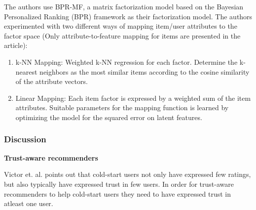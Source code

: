 The authors use BPR-MF, a matrix factorization model based on the Bayesian Personalized Ranking (BPR) framework as their factorization model. The authors experimented with two different ways of mapping item/user attributes to the factor space (Only attribute-to-feature mapping for items are presented in the article):

\begin{enumerate}
\item k-NN Mapping:	Weighted k-NN regression for each factor. Determine the k-nearest neighbors as the most similar items according to the cosine similarity of the attribute vectors.
\item Linear Mapping: Each item factor is expressed by a weighted sum of the item attributes. Suitable parameters for the mapping function is learned by optimizing the model for the squared error on latent features.
\end{enumerate}

\subsubsection{Discussion}


\textbf{Trust-aware recommenders}


Victor et. al. \cite{Victor2008} points out that cold-start users not only have expressed few ratings, but also typically have expressed trust in few users. In order for trust-aware recommenders to help cold-start users they need to have expressed trust in atleast one user.


